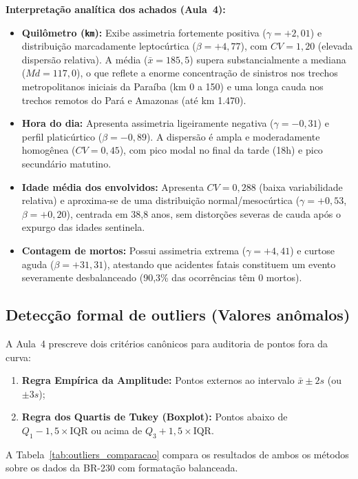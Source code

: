 \documentclass[11pt,a4paper]{article}
\begin{document}
\textbf{Interpretação analítica dos achados (Aula~4):}
\begin{itemize}
  \item \textbf{Quilômetro (\texttt{km}):} Exibe assimetria fortemente positiva ($\gamma = +2,01$) e distribuição marcadamente leptocúrtica ($\beta = +4,77$), com $CV = 1,20$ (elevada dispersão relativa). A média ($\bar{x} = 185,5$) supera substancialmente a mediana ($Md = 117,0$), o que reflete a enorme concentração de sinistros nos trechos metropolitanos iniciais da Paraíba (km 0 a 150) e uma longa cauda nos trechos remotos do Pará e Amazonas (até km 1.470).
  \item \textbf{Hora do dia:} Apresenta assimetria ligeiramente negativa ($\gamma = -0,31$) e perfil platicúrtico ($\beta = -0,89$). A dispersão é ampla e moderadamente homogênea ($CV = 0,45$), com pico modal no final da tarde (18h) e pico secundário matutino.
  \item \textbf{Idade média dos envolvidos:} Apresenta $CV = 0,288$ (baixa variabilidade relativa) e aproxima-se de uma distribuição normal/mesocúrtica ($\gamma = +0,53$, $\beta = +0,20$), centrada em 38,8 anos, sem distorções severas de cauda após o expurgo das idades sentinela.
  \item \textbf{Contagem de mortos:} Possui assimetria extrema ($\gamma = +4,41$) e curtose aguda ($\beta = +31,31$), atestando que acidentes fatais constituem um evento severamente desbalanceado (90,3\% das ocorrências têm 0 mortos).
\end{itemize}

\subsection{Detecção formal de outliers (Valores anômalos)}

A Aula~4 prescreve dois critérios canônicos para auditoria de pontos fora da curva:
\begin{enumerate}
  \item \textbf{Regra Empírica da Amplitude:} Pontos externos ao intervalo $\bar{x} \pm 2s$ (ou $\pm 3s$);
  \item \textbf{Regra dos Quartis de Tukey (Boxplot):} Pontos abaixo de $Q_1 - 1,5 \times \text{IQR}$ ou acima de $Q_3 + 1,5 \times \text{IQR}$.
\end{enumerate}

A Tabela~\ref{tab:outliers_comparacao} compara os resultados de ambos os métodos sobre os dados da BR-230 com formatação balanceada.
\end{document}
